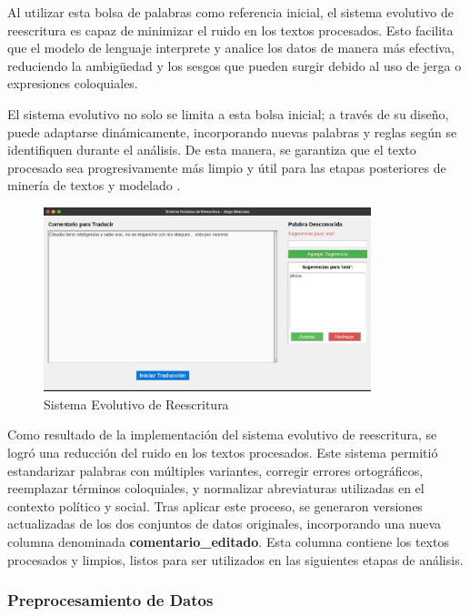 \documentclass[10pt, a4paper]{article}
\begin{document}
	Al utilizar esta bolsa de palabras como referencia inicial, el sistema evolutivo de reescritura es capaz de minimizar el ruido en los textos procesados. Esto facilita que el modelo de lenguaje interprete y analice los datos de manera más efectiva, reduciendo la ambigüedad y los sesgos que pueden surgir debido al uso de jerga o expresiones coloquiales.
	
	El sistema evolutivo no solo se limita a esta bolsa inicial; a través de su diseño, puede adaptarse dinámicamente, incorporando nuevas palabras y reglas según se identifiquen durante el análisis. De esta manera, se garantiza que el texto procesado sea progresivamente más limpio y útil para las etapas posteriores de minería de textos y modelado \parencite{galindo1991sistemas}.
	
	\begin{figure}[h!] %
		\centering
		\includegraphics[width=0.85\textwidth]{evolutivo.png} %
		\caption{Sistema Evolutivo de Reescritura} %
		\label{fig:evolutivo} %
	\end{figure}
	
	Como resultado de la implementación del sistema evolutivo de reescritura, se logró una reducción del ruido en los textos procesados. Este sistema permitió estandarizar palabras con múltiples variantes, corregir errores ortográficos, reemplazar términos coloquiales, y normalizar abreviaturas utilizadas en el contexto político y social. Tras aplicar este proceso, se generaron versiones actualizadas de los dos conjuntos de datos originales, incorporando una nueva columna denominada \textbf{comentario\_editado}. Esta columna contiene los textos procesados y limpios, listos para ser utilizados en las siguientes etapas de análisis.
	
	\subsubsection{Preprocesamiento de Datos}
	
\end{document}
